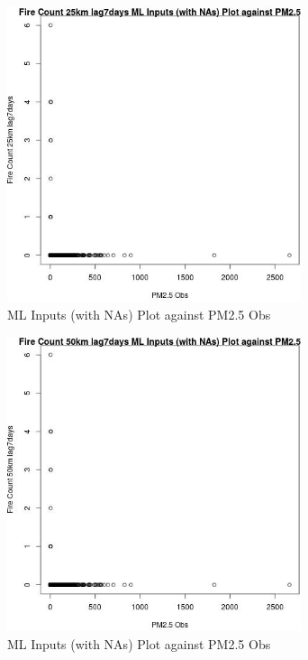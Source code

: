 \begin{figure} 
\centering  
\includegraphics[width=0.77\textwidth]{Code_Outputs/Report_ML_input_PM25_Step4_part_e_de_duplicated_aves_compiled_2019-05-20wNAs_Fire_Count_25km_lag7daysvPM25_Obs.jpg} 
\caption{\label{fig:Report_ML_input_PM25_Step4_part_e_de_duplicated_aves_compiled_2019-05-20wNAsFire_Count_25km_lag7daysvPM25_Obs}ML Inputs (with NAs) Plot against PM2.5 Obs} 
\end{figure} 
 

\clearpage 

\begin{figure} 
\centering  
\includegraphics[width=0.77\textwidth]{Code_Outputs/Report_ML_input_PM25_Step4_part_e_de_duplicated_aves_compiled_2019-05-20wNAs_Fire_Count_50km_lag7daysvPM25_Obs.jpg} 
\caption{\label{fig:Report_ML_input_PM25_Step4_part_e_de_duplicated_aves_compiled_2019-05-20wNAsFire_Count_50km_lag7daysvPM25_Obs}ML Inputs (with NAs) Plot against PM2.5 Obs} 
\end{figure} 
 

